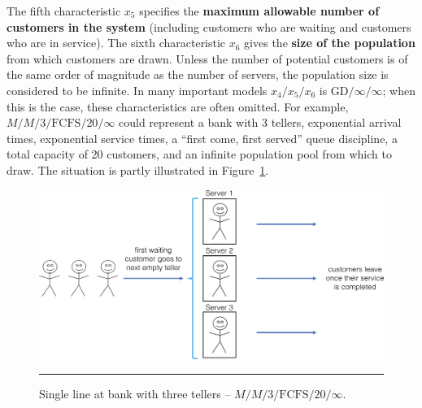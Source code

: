 \newl
The fifth characteristic $x_5$ specifies the \textbf{maximum allowable number of customers in the system} (including customers who are waiting and customers who are in service). The sixth characteristic $x_6$ gives the \textbf{size of the population} from which customers are drawn. Unless
the number of potential customers is of the same order of magnitude as the number of servers, the population size is considered to be infinite. \newl In many important models $x_4/x_5/x_6$ is $\textrm{GD}/\infty/\infty$; when this is the case, these characteristics are often omitted.  For example, $M/M/3/\textrm{FCFS}/20/\infty$ could represent a bank with 3 tellers, exponential arrival times, exponential service times, a ``first come, first served'' queue discipline, a total capacity of 20 customers, and an infinite population pool from which to draw. The situation is partly illustrated in Figure~\ref{fig:1}.
\begin{figure}[!t]
	\centering
		\includegraphics[width=\textwidth]{Images/fig1Queue.png}
	\caption[\small Single line at bank with three tellers]{\small Single line at bank with three tellers -- $M/M/3/\textrm{FCFS}/20/\infty$.}
	\label{fig:1}\hrule
\end{figure}
\vfill

